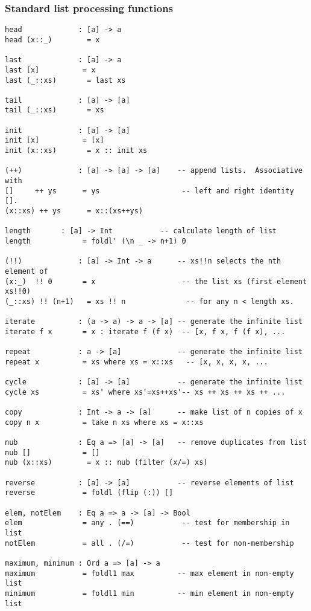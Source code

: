 \subsubsection*{Standard list processing functions}
\begin{verbatim}
head             : [a] -> a
head (x::_)        = x

last             : [a] -> a
last [x]          = x
last (_::xs)       = last xs

tail             : [a] -> [a]
tail (_::xs)       = xs

init             : [a] -> [a]
init [x]          = [x]
init (x::xs)       = x :: init xs

(++)             : [a] -> [a] -> [a]    -- append lists.  Associative with
[]     ++ ys      = ys                   -- left and right identity [].
(x::xs) ++ ys      = x::(xs++ys)

length		 : [a] -> Int           -- calculate length of list
length            = foldl' (\n _ -> n+1) 0

(!!)             : [a] -> Int -> a      -- xs!!n selects the nth element of
(x:_)  !! 0       = x                    -- the list xs (first element xs!!0)
(_::xs) !! (n+1)   = xs !! n              -- for any n < length xs.

iterate          : (a -> a) -> a -> [a] -- generate the infinite list
iterate f x       = x : iterate f (f x)  -- [x, f x, f (f x), ...

repeat           : a -> [a]             -- generate the infinite list
repeat x          = xs where xs = x::xs   -- [x, x, x, x, ...

cycle            : [a] -> [a]           -- generate the infinite list
cycle xs          = xs' where xs'=xs++xs'-- xs ++ xs ++ xs ++ ...

copy             : Int -> a -> [a]      -- make list of n copies of x
copy n x          = take n xs where xs = x::xs

nub              : Eq a => [a] -> [a]   -- remove duplicates from list
nub []            = []
nub (x::xs)        = x :: nub (filter (x/=) xs)

reverse          : [a] -> [a]           -- reverse elements of list
reverse           = foldl (flip (:)) []

elem, notElem    : Eq a => a -> [a] -> Bool
elem              = any . (==)           -- test for membership in list
notElem           = all . (/=)           -- test for non-membership

maximum, minimum : Ord a => [a] -> a
maximum           = foldl1 max          -- max element in non-empty list
minimum           = foldl1 min          -- min element in non-empty list


\end{verbatim}
